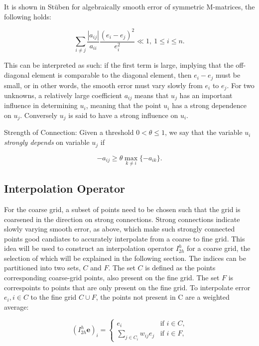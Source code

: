 It is shown in Stüben for algebraically smooth error of symmetric M-matrices, the following holds:

\begin{equation}
	\sum_{i \neq j}{\frac{|a_{ij}|}{a_{ii}}\frac{(e_i - e_j)^2}{e_i^2}} \ll 1,\ 1 \leq i \leq n.
	\label{eq:strong_connection}
\end{equation}

This can be interpreted as such: if the first term is large, implying that the off-diagonal element is comparable to the diagonal element, then $e_i - e_j$ must be small, or in other words, the smooth error must vary slowly from $e_i$ to $e_j$. For two unknowns, a relatively large coefficient $a_{ij}$ means that $u_j$ has an important influence in determining $u_i$, meaning that the point $u_i$ has a strong dependence on $u_j$. Conversely $u_j$ is said to have a strong influence on $u_i$. 

Strength of Connection: Given a threshold $0 < \theta \leq 1$, we say that the variable $u_i$ \emph{strongly depends} on variable $u_j$ if

\begin{equation}
-a_{ij} \geq \theta \max_{k \neq i}{\{-a_{ik}\}}.
\label{eq:strong_connection2}
\end{equation}


\subsection{Interpolation Operator} %

For the coarse grid, a subset of points need to be chosen such that the grid is coarsened in the direction on strong connections. Strong connections indicate slowly varying smooth error, as above, which make such strongly connected points good candiates to accurately interpolate from a coarse to fine grid. This idea will be used to construct an interpolation operator $I_{2h}^h$ for a coarse grid, the selection of which will be explained in the following section. The indices can be partitioned into two sets, $C$ and $F$. The set $C$ is defined as the points corresponding coarse-grid points, also present on the fine grid. The set $F$ is correspoints to points that are only present on the fine grid. To interpolate error $e_i, i \in C$ to the fine grid $C \cup F$, the points not present in C are a weighted average:

\begin{equation}
	(I_{2h}^h\mathbf{e})_i = 
		\begin{cases}
			e_i & \text{if $i \in C$,} \\
			\displaystyle \sum_{j \in C_i}{w_{ij}e_j} & \text{if $i \in F$,}
		\end{cases}
	\label{eq:interpolation_operator}
\end{equation}

